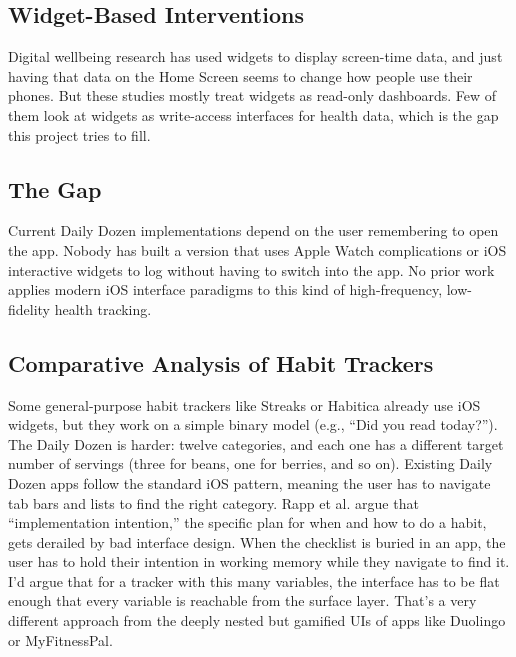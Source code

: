 \documentclass[10pt,twocolumn]{article}
\begin{document}
\subsection{Widget-Based Interventions}

Digital wellbeing research has used widgets to display screen-time data, and just having that data on the Home Screen seems to change how people use their phones.\cite{McDanielProspectiveMemory} But these studies mostly treat widgets as read-only dashboards. Few of them look at widgets as write-access interfaces for health data, which is the gap this project tries to fill.

\subsection{The Gap}

Current Daily Dozen implementations depend on the user remembering to open the app. Nobody has built a version that uses Apple Watch complications or iOS interactive widgets to log without having to switch into the app.\cite{AppleHIGWidgets} No prior work applies modern iOS interface paradigms to this kind of high-frequency, low-fidelity health tracking.

\subsection{Comparative Analysis of Habit Trackers}

Some general-purpose habit trackers like Streaks or Habitica already use iOS widgets, but they work on a simple binary model (e.g., ``Did you read today?''). The Daily Dozen is harder: twelve categories, and each one has a different target number of servings (three for beans, one for berries, and so on).\cite{GregerHowNotToDie} Existing Daily Dozen apps follow the standard iOS pattern, meaning the user has to navigate tab bars and lists to find the right category. Rapp et al. argue that ``implementation intention,'' the specific plan for when and how to do a habit, gets derailed by bad interface design.\cite{BROADStudy} When the checklist is buried in an app, the user has to hold their intention in working memory while they navigate to find it.\cite{AppleHIGWidgets} I'd argue that for a tracker with this many variables, the interface has to be flat enough that every variable is reachable from the surface layer. That's a very different approach from the deeply nested but gamified UIs of apps like Duolingo or MyFitnessPal.
\end{document}
